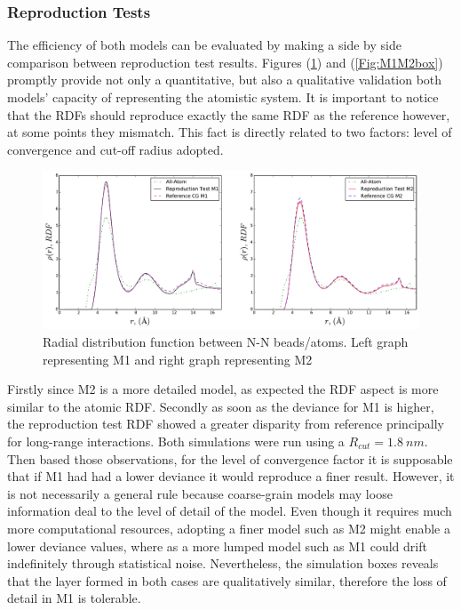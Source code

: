\documentclass[10pt,a4paper,twoside]{article}
\begin{document}
\subsubsection*{Reproduction Tests}
 The efficiency of both models can be evaluated by making a side by side comparison between reproduction test results. Figures (\ref{Fig:M1M2rdf}) and (\ref{Fig:M1M2box}) promptly provide not only a quantitative, but also a qualitative validation both models' capacity of representing the atomistic system. It is important to notice that the RDFs should reproduce exactly the same RDF as the reference however, at some points they mismatch. This fact is directly related to two factors: level of convergence and cut-off radius adopted.
     \begin{figure}[ht!]
  \begin{center}
	\includegraphics[width=1 \textwidth]{./graphs/rdfM1M2}
	\caption{Radial distribution function between N-N beads/atoms. Left graph representing M1 and right graph representing M2}
	\label{Fig:M1M2rdf}
  \end{center}
\end{figure} 

Firstly since M2 is a more detailed  model, as expected the RDF aspect is more similar to the atomic RDF. Secondly as soon as the deviance for M1 is higher, the reproduction test RDF showed a greater disparity from reference principally for long-range interactions. Both simulations were run using a $R_{cut} = 1.8 \ nm$.  Then based those observations, for the level of convergence factor it is supposable that if M1 had had a lower deviance it would reproduce a finer result. However, it is not necessarily a general rule because coarse-grain models may loose information deal to the level of detail of the model. Even though it requires much more computational resources, adopting a finer model such as M2 might enable a lower deviance values, where as a more lumped model such as M1 could drift indefinitely through statistical noise. Nevertheless, the simulation boxes reveals that the layer formed in both cases are qualitatively similar, therefore the loss of detail in M1 is tolerable.
\end{document}
